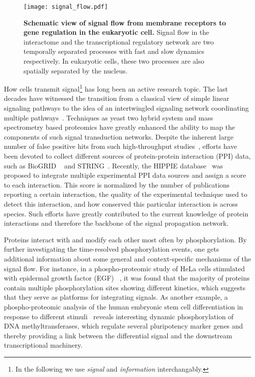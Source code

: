 \begin{figure}[!ht]
\begin{center}
\texttt{[image: signal\_flow.pdf]}
\end{center}
\caption[Signal flow]{{\bf Schematic view of signal flow from membrane 
receptors to gene regulation in the eukaryotic cell.}
Signal flow in the interactome and the transcriptional 
regulatory network are two temporally separated processes 
with
fast and slow dynamics respectively. In eukaryotic cells,
these two processes are also spatially separated by the
nucleus.
}
\label{fig:signal_flow}
\end{figure}

How cells transmit signal\footnote{In the following we
use \emph{signal} and \emph{information} interchangably.} 
has long been an active research topic.
The last decades have witnessed the transition from a classical view of 
simple linear signaling pathways
to the idea of an intertwingled signaling network coordinating multiple 
pathways~\citep{Kholodenko2012}. Techniques as yeast two hybrid system 
and mass spectrometry based
proteomics have greatly enhanced the ability to map the components of such 
signal transduction networks. Despite the inherent large number of false
positive hits from such high-throughput studies~\citep{Mering2002a}, 
efforts have been devoted
to collect different sources of protein-protein interaction 
(PPI) data, such as BioGRID%
~\citep{Stark2006} and STRING~\citep{Szklarczyk2011}. Recently, the HIPPIE
database~\citep{Schaefer2012} was proposed to integrate multiple experimental PPI
data sources and assign a score to each interaction. This
score is normalized by the number of publications reporting 
a certain
interaction, the quality of the experimental technique used
to detect this interaction, and how conserved this particular
interaction is across species. Such efforts have greatly 
contributed to the current knowledge of protein interactions
and therefore the backbone of the signal propagation network.

Proteins interact with and modify each other most often by phosphorylation.
By further investigating the time-resolved phosphorylation
events, one gets additional information about some general
and context-specific mechanisms of the signal flow.
For instance, in a phospho-proteomic study of 
HeLa cells stimulated with epidermal growth factor (EGF)~%
\citep{Olsen2006},
it was found that the majority of proteins contain multiple 
phosphorylation sites showing different kinetics, which 
suggests that they serve as platforms for integrating 
signals. As another example, a phospho-proteomic analysis
of the human embryonic stem cell differentiation in response
to different stimuli~\citep{Rigbolt2011} reveals interesting
dynamic phosphorylation of DNA methyltransferases, which
regulate several pluripotency marker genes and thereby 
providing a link between the differential signal and the
downstream transcriptional machinery.


